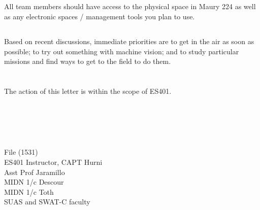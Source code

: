\documentclass[10pt,courier]{navymemo}
\newcommand{\myroot}{../..}
\begin{document}
\subsection{} All team members should have access to the physical space in Maury 224 as well as any electronic spaces / management tools you plan to use. 

\subsection{} Based on recent discussions, immediate priorities are to get in the air as soon as possible; to try out something with machine vision; and to study particular missions and find ways to get to the field to do them. 

\section{}%
The action of this letter is within the scope of ES401. 

\noclosing{}\\
\signspace{}
\signature{D Evangelista}

\noindent\hspace*{4in}{235 Maury Hall}\\
\hspace*{4in}{(410) 293-6132}\\


\copyto{}
File (1531)\\
ES401 Instructor, CAPT Hurni\\
Asst Prof Jaramillo\\
MIDN 1/c Descour\\
MIDN 1/c Toth\\
SUAS and SWAT-C faculty\\


\navyrecordnote

\end{document}
